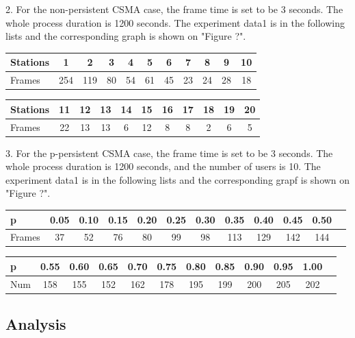 \documentclass[11pt,a4paper]{report}
\begin{document}
2. For the non-persistent CSMA case, the frame time is set to be 3 seconds. The whole process duration is 1200 seconds. The experiment data1 is in the following lists and the corresponding graph is shown on "Figure ?". 
\begin{table}[htbp]
\begin{tabular}{lcccccccccc}
\toprule
Stations & 1 & 2 & 3 & 4 & 5 & 6 & 7 & 8 & 9 & 10 \\
\midrule
Frames & 254 & 119 & 80 & 54 & 61 & 45 & 23 & 24 & 28 & 18 \\
\bottomrule
\end{tabular}
\end{table}

\begin{table}[htbp]
\begin{tabular}{lcccccccccc}
\toprule
Stations & 11 & 12 & 13  & 14 & 15 & 16 & 17 & 18 & 19 & 20 \\
\midrule
Frames & 22 & 13 & 13 & 6 & 12 & 8 & 8 & 2 & 6 & 5 \\
\bottomrule
\end{tabular}
\end{table}

3. For the p-persistent CSMA case, the frame time is set to be 3 seconds. The whole process duration is 1200 seconds, and the number of users is 10. The experiment data1 is in the following lists and the corresponding grapf is shown on "Figure ?".
\begin{table}[htbp]
\begin{tabular}{lccccccccccc}
\toprule
p & 0.05 & 0.10 & 0.15  & 0.20 & 0.25 & 0.30 & 0.35 & 0.40 & 0.45 & 0.50 \\
\midrule
Frames & 37 & 52 & 76 & 80 & 99 & 98 & 113 & 129 & 142 & 144 \\
\bottomrule
\end{tabular}
\end{table}

\begin{table}[htbp]
\begin{tabular}{lccccccccccc}
\toprule
p & 0.55 & 0.60 & 0.65  & 0.70 & 0.75 & 0.80 & 0.85 & 0.90 & 0.95 & 1.00 \\
\midrule
Num & 158 & 155 & 152 & 162 & 178 & 195 & 199 & 200 & 205 & 202 \\
\bottomrule
\end{tabular}
\end{table}

\subsection*{Analysis}
\end{document}
